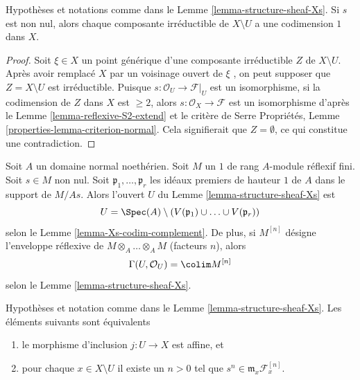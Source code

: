 \begin{lemma}
\label{lemma-Xs-codim-complement}
Hypothèses et notations comme dans le Lemme  \ref{lemma-structure-sheaf-Xs}. Si  $s$  est non
nul, alors chaque composante irréductible de  $X \setminus U$  a une codimension
 $1$  dans  $X$.
\end{lemma}

\begin{proof}
Soit  $\xi \in X$  un point générique d'une composante irréductible  $Z$  de
 $X \setminus U$. Après avoir remplacé  $X$  par un voisinage ouvert de
 $\xi$ , on peut supposer que  $Z = X \setminus U$  est irréductible. Puisque
 $s : \mathcal{O}_U \to \mathcal{F}|_U$  est un isomorphisme, si la codimension de  $Z$  dans
 $X$  est  $\geq 2$, alors  $s : \mathcal{O}_X \to \mathcal{F}$  est un isomorphisme d'après le
Lemme  \ref{lemma-reflexive-S2-extend}  et le critère de Serre Propriétés, Lemme  \ref{properties-lemma-criterion-normal}. Cela
signifierait que  $Z = \emptyset$, ce qui constitue une contradiction.
\end{proof}

\begin{remark}
\label{remark-structure-sheaf-Xs}
Soit  $A$  un domaine normal noethérien. Soit  $M$  un  $1$ 
de rang  $A$-module réflexif fini. Soit  $s \in M$  non nul. Soit
 $\mathfrak p_1, \ldots, \mathfrak p_r$  les idéaux premiers de hauteur  $1$  de  $A$  dans le
support de  $M/As$. Alors l'ouvert  $U$  du Lemme  \ref{lemma-structure-sheaf-Xs}  est
$$
U = \Spec(A) \setminus
\left(V(\mathfrak p_1) \cup \ldots \cup V(\mathfrak p_r)\right)
$$
selon le Lemme  \ref{lemma-Xs-codim-complement}. De plus, si  $M^{[n]}$  désigne l'enveloppe
réflexive de  $M \otimes_A \ldots \otimes_A M$  (facteurs $n$), alors
$$
\Gamma(U, \mathcal{O}_U) = \colim M^{[n]}
$$
selon le Lemme  \ref{lemma-structure-sheaf-Xs}.
\end{remark}

\begin{lemma}
\label{lemma-affine-Xs}
Hypothèses et notation comme dans le Lemme  \ref{lemma-structure-sheaf-Xs}. Les éléments suivants
sont équivalents
\begin{enumerate}
\item le morphisme d'inclusion  $j : U \to X$  est affine, et
\item pour chaque  $x \in X \setminus U$  il existe un  $n > 0$  tel que  $s^n \in \mathfrak m_x \mathcal{F}^{[n]}_x$.
\end{enumerate}
\end{lemma}

